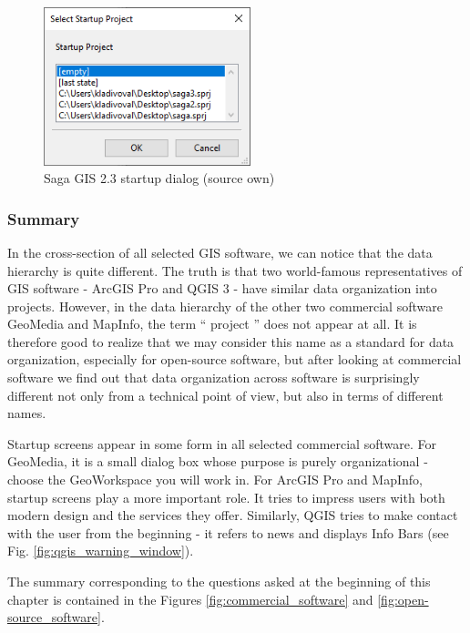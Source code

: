 \documentclass[a4paper,10pt,twoside]{article}
\begin{document}
\vspace{0.3cm}
\begin{figure}[hbt!] 
\begin{center}
\includegraphics[width=6cm]{../pictures/saga_startup.png} 
\caption[Saga GIS 2.3 startup dialog (source own)]{Saga GIS 2.3 startup dialog (source own)}
\label{fig:saga_startup}
\end{center}
\end{figure}

\subsubsection{Summary}

In the cross-section of all selected GIS software, we can notice that the data hierarchy is quite different. The truth is that two world-famous representatives of GIS software - ArcGIS Pro and QGIS 3 -  have similar data organization into projects. However, in the data hierarchy of the other two commercial software GeoMedia and MapInfo, the term `` project '' does not appear at all. It is therefore good to realize that we may consider this name as a standard for data organization, especially for open-source software, but after looking at commercial software we find out that data organization across software is surprisingly different not only from a technical point of view, but also in terms of different names.

Startup screens appear in some form in all selected commercial software. For GeoMedia, it is a small dialog box whose purpose is purely organizational - choose the GeoWorkspace you will work in. For ArcGIS Pro and MapInfo, startup screens play a more important role. It tries to impress users with both modern design and the services they offer. Similarly, QGIS tries to make contact with the user from the beginning - it refers to news and displays Info Bars (see Fig. \ref{fig:qgis_warning_window}).

The summary corresponding to the questions asked at the beginning of this chapter is contained in the Figures \ref{fig:commercial_software} and \ref{fig:open-source_software}.
\end{document}
